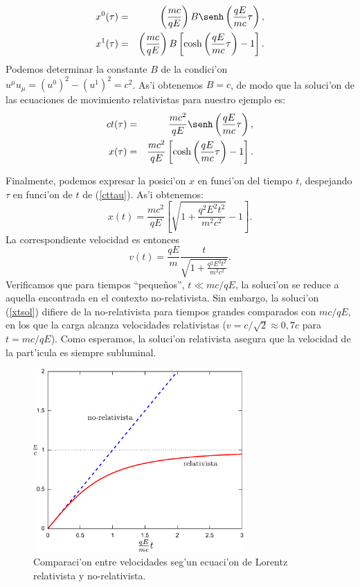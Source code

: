 \begin{eqnarray}
x^0(\tau)&=&\left(\frac{mc}{qE}\right)B\senh\left(\frac{qE}{mc}\tau\right) ,\\
x^1(\tau)&=&\left(\frac{mc}{qE}\right)B\left[\cosh\left(
\frac{qE}{mc}\tau\right)-1\right] .
\end{eqnarray}
Podemos determinar la constante $B$ de la condici'on $u^\mu
u_\mu=(u^0)^2-(u^1)^2=c^2$. As'i obtenemos $B=c$, de modo que la
soluci'on de las ecuaciones de movimiento relativistas para nuestro ejemplo es:
\begin{eqnarray}
ct(\tau)&=&\frac{mc^2}{qE}\senh\left( \frac{qE}{mc}\tau\right), \label{cttau}\\
x(\tau)&=&\frac{mc^2}{qE}\left[ \cosh\left( \frac{qE}{mc}\tau\right)-1\right] .
\end{eqnarray}

Finalmente, podemos expresar la posici'on $x$ en funci'on del tiempo $t$,
despejando $\tau$ en funci'on de $t$ de (\ref{cttau}). As'i obtenemos:
\begin{equation}
x(t) = \frac{mc^2}{qE} \left[ \sqrt{1 + \frac{q^2 E^2 t^2}{m^2c^2}} - 1 \right].
\label{xtsol}
\end{equation}
La correspondiente velocidad es entonces
\begin{equation}
v(t) = \frac{qE}{m}\frac{t}{\sqrt{1 + \frac{q^2 E^2 t^2}{m^2c^2}}}.
\end{equation}
Verificamos que para tiempos ``peque\~nos'', $t\ll {mc}/{qE}$, la soluci'on se
reduce a aquella encontrada en el contexto no-relativista. Sin embargo, la
soluci'on (\ref{xtsol}) difiere de la no-relativista para tiempos grandes
comparados con ${mc}/{qE}$, en los que la carga alcanza velocidades
relativistas ($v={c}/{\sqrt{2}}\approx 0,7c$ para $t={mc}/{qE}$). Como esperamos, la soluci'on relativista asegura que la velocidad de la part'icula es siempre subluminal.

\begin{center}
\begin{figure}[H]
\centerline{\includegraphics[height=7cm]{fig/fig-trayectoria-1D-rel-norel.pdf}}
\caption{Comparaci'on entre velocidades seg'un ecuaci'on de Lorentz relativista y no-relativista.}
\label{fig:relnorel}
\end{figure}
\end{center}


